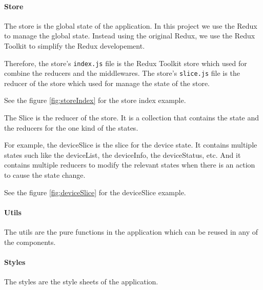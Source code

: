 

\paragraph{Store}
The store is the global state of the application. 
In this project we use the Redux to manage the global state.
Instead using the original Redux, we use the Redux Toolkit to simplify the Redux developement.

Therefore, the store's \texttt{index.js} file is the Redux Toolkit store 
which used for combine the reducers and the middlewares. 
The store's \texttt{slice.js} file is the reducer of the store 
which used for manage the state of the store. 

See the figure \ref{fig:storeIndex} for the store index example. 

The Slice is the reducer of the store. 
It is a collection that contains the state and the reducers for the one kind of the states.

For example, the deviceSlice is the slice for the device state. 
It contains multiple states such like the deviceList, the deviceInfo, the deviceStatus, etc.
And it contains multiple reducers to modify the relevant states when there is an action to cause the state change.

See the figure \ref{fig:deviceSlice} for the deviceSlice example.




\paragraph{Utils}
The utils are the pure functions in the application which can be reused in any of the components.

\paragraph{Styles}
The styles are the style sheets of the application.

\pagebreak